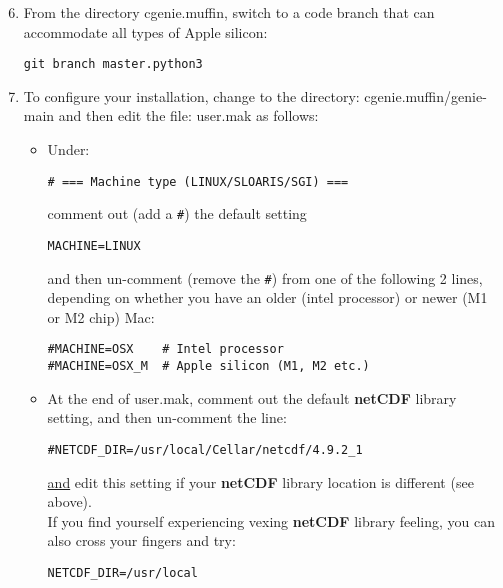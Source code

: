 \documentclass[10pt,twoside]{article}
\begin{document}
\begin{enumerate}[noitemsep]
\setcounter{enumi}{5}

\vspace{1mm}
\item From the directory \textsf{cgenie.muffin}, switch to a code branch that can accommodate all types of Apple silicon:
\vspace{-2pt}
\begin{verbatim}
git branch master.python3
\end{verbatim}
\vspace{-2pt}

\vspace{1mm}
\item To configure your installation, change to the directory: \textsf{cgenie.muffin/genie-main} and then edit the file: \textsf{user.mak} as follows:

\begin{itemize}

\vspace{1mm}
\item Under: 
\vspace{-2pt}
\begin{verbatim}
# === Machine type (LINUX/SLOARIS/SGI) ===
\end{verbatim}
\vspace{-2pt}
comment out (add a \texttt{\#}) the default setting
\vspace{-2pt}
\begin{verbatim}
MACHINE=LINUX
\end{verbatim}
and then un-comment (remove the \texttt{\#}) from one of the following 2 lines, depending on whether you have an older (intel processor) or newer (M1 or M2 chip) Mac:
\vspace{-2pt}
\begin{verbatim}
#MACHINE=OSX	# Intel processor
#MACHINE=OSX_M	# Apple silicon (M1, M2 etc.)
\end{verbatim}
\vspace{-2pt}

\vspace{1mm}
\item At the end of \textsf{user.mak}, comment out the default \textbf{netCDF} library setting, and then un-comment the line: 
\vspace{-2pt}
\begin{verbatim}
#NETCDF_DIR=/usr/local/Cellar/netcdf/4.9.2_1
\end{verbatim}
\vspace{-2pt}
\uline{and} edit this setting if your \textbf{netCDF} library location is different (see above). 
\\If you find yourself experiencing vexing \textbf{netCDF} library feeling, you can also cross your fingers and try:
\vspace{-2pt}
\begin{verbatim}
NETCDF_DIR=/usr/local
\end{verbatim}
\vspace{-2pt}


\end{itemize}
\end{enumerate}
\end{document}
